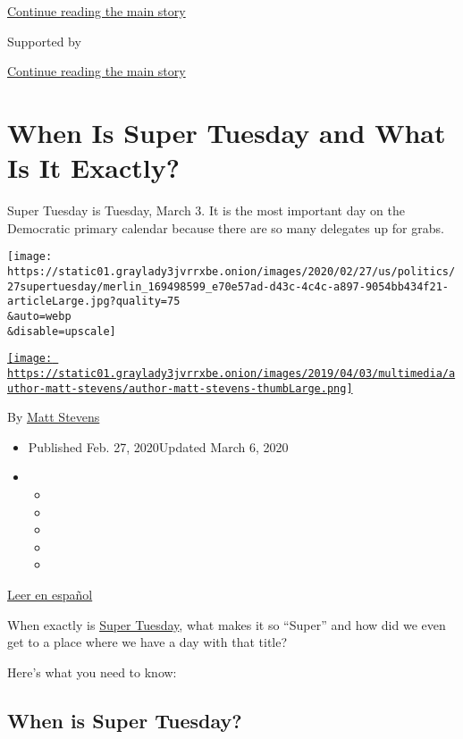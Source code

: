\protect\hyperlink{after-top}{Continue reading the main story}

Supported by

\protect\hyperlink{after-sponsor}{Continue reading the main story}

\hypertarget{when-is-super-tuesday-and-what-is-it-exactly}{%
\section{When Is Super Tuesday and What Is It
Exactly?}\label{when-is-super-tuesday-and-what-is-it-exactly}}

Super Tuesday is Tuesday, March 3. It is the most important day on the
Democratic primary calendar because there are so many delegates up for
grabs.

\texttt{[image: https://static01.graylady3jvrrxbe.onion/images/2020/02/27/us/politics/27supertuesday/merlin\_169498599\_e70e57ad-d43c-4c4c-a897-9054bb434f21-articleLarge.jpg?quality=75\\\&auto=webp\\\&disable=upscale]}

\href{https://www.nytimes3xbfgragh.onion/by/matt-stevens}{\texttt{[image: https://static01.graylady3jvrrxbe.onion/images/2019/04/03/multimedia/author-matt-stevens/author-matt-stevens-thumbLarge.png]}}

By \href{https://www.nytimes3xbfgragh.onion/by/matt-stevens}{Matt
Stevens}

\begin{itemize}
\item
  Published Feb. 27, 2020Updated March 6, 2020
\item
  \begin{itemize}
  \item
  \item
  \item
  \item
  \item
  \end{itemize}
\end{itemize}

\href{https://www.nytimes3xbfgragh.onion/es/2020/03/02/espanol/mundo/super-martes-que-es.html}{Leer
en español}

When exactly is
\href{https://www.nytimes3xbfgragh.onion/news-event/super-tuesday}{Super
Tuesday}, what makes it so ``Super'' and how did we even get to a place
where we have a day with that title?

Here's what you need to know:

\hypertarget{when-is-super-tuesday}{%
\subsection{When is Super Tuesday?}\label{when-is-super-tuesday}}

